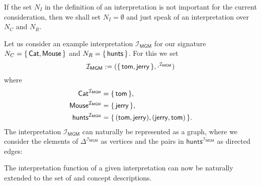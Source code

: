 If the set $N_I$ in the definition of an interpretation is not important for the current
consideration, then we shall set $N_I = \emptyset$ and just speak of an interpretation
over $N_C$ and $N_R$.

\begin{Example}
  \label{expl:tom-hunts-jerry-hunts-tom-interpretation}
  Let us consider an example interpretation $\mathcal{I}_{\mathsf{MGM}}$ for our signature
  $N_C = {\{\, \mathsf{Cat}, \mathsf{Mouse} \,\}}$ and $N_R = {\{\, \mathsf{hunts} \,\}}$.  For
  this we set
  \begin{equation*}
    \mathcal{I}_{\mathsf{MGM}} := ({\{\, \mathsf{tom}, \mathsf{jerry} \,\}}, \cdot^{\mathcal{I}_{\mathsf{MGM}}})
  \end{equation*}
  where
  \begin{align*}
    \mathsf{Cat}^{\mathcal{I}_{\mathsf{MGM}}} &= {\{\, \mathsf{tom} \,\}}, \\
    \mathsf{Mouse}^{\mathcal{I}_{\mathsf{MGM}}} &= {\{\, \mathsf{jerry} \,\}}, \\
    \mathsf{hunts}^{\mathcal{I}_{\mathsf{MGM}}} &= {\{\, (\mathsf{tom}, \mathsf{jerry}),
      (\mathsf{jerry}, \mathsf{tom}) \,\}}.
  \end{align*}
  The interpretation $\mathcal{I}_{\mathsf{MGM}}$ can naturally be represented as a graph,
  where we consider the elements of $\Delta^{\mathcal{I}_{\mathsf{MGM}}}$ as vertices and
  the pairs in $\mathsf{hunts}^{\mathcal{I}_{\mathsf{MGM}}}$ as directed edges:
  \begin{center}
  \end{center}
\end{Example}

The interpretation function of a given interpretation can now be naturally extended to the
set of \EL and \ELbot concept descriptions.

